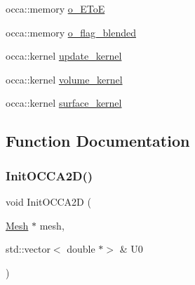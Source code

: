\begin{DoxyCompactItemize}
\item 
occa\+::memory \hyperlink{a00584_a243a7539f4c5cce1e6768e8f04eedbe5}{o\+\_\+\+E\+ToE}
\item 
occa\+::memory \hyperlink{a00584_aa4e74c1ffb437923b5543a100bd74542}{o\+\_\+flag\+\_\+blended}
\item 
occa\+::kernel \hyperlink{a00584_ad7aaa8472c4cbeb7f80bbee508869a84}{update\+\_\+kernel}
\item 
occa\+::kernel \hyperlink{a00584_ac6d0fe63aa1a53fb7640c58003789abe}{volume\+\_\+kernel}
\item 
occa\+::kernel \hyperlink{a00584_a626bf2a5a88dd7dd5a62a7aa4b215740}{surface\+\_\+kernel}
\end{DoxyCompactItemize}


\subsection{Function Documentation}
\mbox{\label{a00584_a0dee5ebc8cec6627fc23083e47b4ca11}} 
\subsubsection{\texorpdfstring{Init\+O\+C\+C\+A2\+D()}{InitOCCA2D()}}
{\footnotesize\ttfamily void Init\+O\+C\+C\+A2D (\begin{DoxyParamCaption}\item[{\hyperlink{a00557_aeffbe0891ab73a4d8964c9cb7978426e}{Mesh} $\ast$}]{mesh,  }\item[{std\+::vector$<$ double $\ast$$>$ \&}]{U0 }\end{DoxyParamCaption})}

